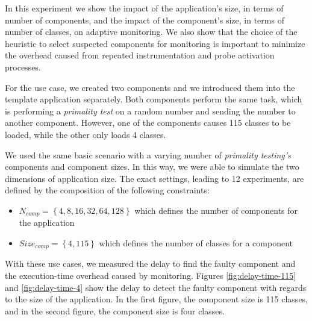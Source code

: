 In this experiment we show the impact of the application's size, in terms of number of components, and the impact of the component's size, in terms of number of classes, on adaptive monitoring. We also show that the choice of the heuristic to select suspected components for monitoring is important to minimize the overhead caused from repeated instrumentation and probe activation processes.

For the use case, we created two components and we introduced them into the template application separately.
Both components perform the same task, which is performing a \textit{primality test} on a random number and sending the number to another component.
However, one of the components causes 115 classes to be loaded, while the other only loads 4 classes.

We used the same basic scenario with a varying number of \textit{primality testing's} components and component sizes.
In this way, we were able to simulate the two dimensions of application size.
The exact settings, leading to 12 experiments, are defined by the composition of the following constraints:
\begin{itemize}
	\item $N_{comp} = \left\lbrace 4, 8, 16, 32, 64, 128 \right\rbrace$  which defines the number of components for the application
	\item $Size_{comp}=\left\lbrace 4, 115 \right\rbrace$ which defines the number of classes for a component
\end{itemize} 

With these use cases, we measured the delay to find the faulty component and the execution-time overhead caused by monitoring.
Figures \ref{fig:delay-time-115} and \ref{fig:delay-time-4} show the delay to detect the faulty component with regards to the size of the application.
In the first figure, the component size is 115 classes, and in the second figure, the component size is four classes.




